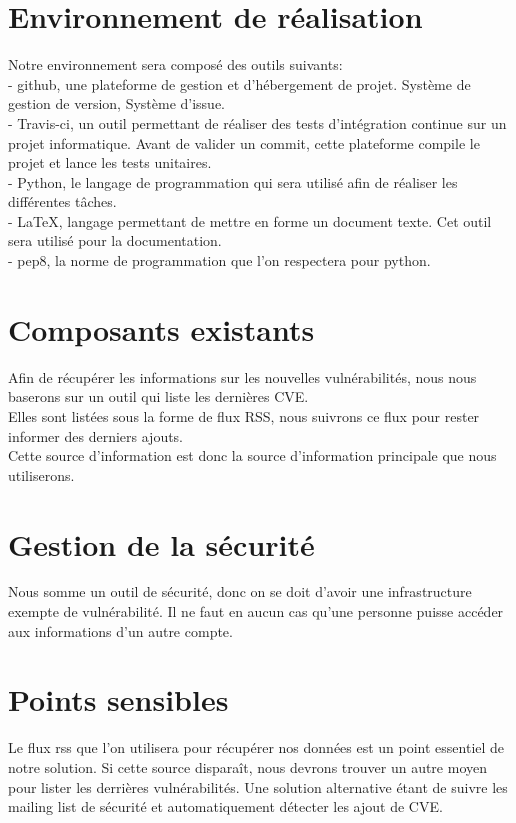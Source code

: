 \section{Environnement de réalisation}
Notre environnement sera composé des outils suivants:\\
- github, une plateforme de gestion et d'hébergement de projet. Système de gestion de version, Système d’issue.\\
- Travis-ci, un outil permettant de réaliser des tests d’intégration continue sur un projet informatique. Avant de valider un commit, cette plateforme compile le projet et lance les tests unitaires.\\
- Python, le langage de programmation qui sera utilisé afin de réaliser les différentes tâches.\\
- LaTeX, langage permettant de mettre en forme un document texte. Cet outil sera utilisé pour la documentation.\\
- pep8, la norme de programmation que l’on respectera pour python.\\

\section{Composants existants}
Afin de récupérer les informations sur les nouvelles vulnérabilités, nous nous baserons sur un outil qui liste les dernières CVE.\\
Elles sont listées sous la forme de flux RSS, nous suivrons ce flux pour rester informer des derniers ajouts.\\
Cette source d’information est donc la source d’information principale que nous utiliserons.\\

\section{Gestion de la sécurité}
Nous somme un outil de sécurité, donc on se doit  d’avoir une infrastructure exempte de vulnérabilité. Il ne faut en aucun cas qu’une personne puisse accéder aux informations d’un autre compte.\\

\section{Points sensibles}
Le flux rss que l’on utilisera pour récupérer nos données est un point essentiel de notre solution. Si cette source disparaît, nous devrons trouver un autre moyen pour lister les derrières vulnérabilités. Une solution alternative étant de suivre les mailing list de sécurité et automatiquement détecter les ajout de CVE.\\